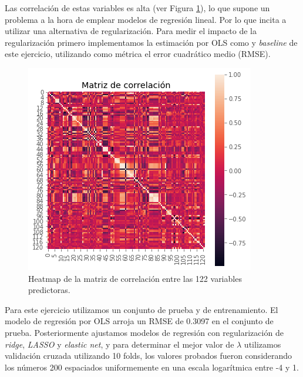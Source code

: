 \documentclass{article}
\begin{document}
Las correlación de estas variables es alta (ver Figura \ref{fig:matriz_cor_ejer1}), lo que supone un problema a la hora de emplear modelos de regresión lineal. Por lo que incita a utilizar una alternativa de regularización. Para medir el impacto de la regularización primero implementamos la estimación por OLS como y \textit{baseline} de este ejercicio, utilizando como métrica el error cuadrático medio (RMSE). 
\begin{figure}[H]
    \centering
    \includegraphics[scale=0.4]{figure/matriz_cor_ejer1.png}
    \caption{Heatmap de la matriz de correlación entre las 122 variables predictoras.}
    \label{fig:matriz_cor_ejer1}
\end{figure}
Para este ejercicio utilizamos un conjunto de prueba y de entrenamiento. El modelo de regresión por OLS arroja un RMSE de 0.3097 en el conjunto de prueba. Posteriormente ajustamos modelos de regresión con regularización de \textit{ridge}, \textit{LASSO} y \textit{elastic net}, y para determinar el mejor valor de $\lambda$ utilizamos validación cruzada utilizando 10 folds, los valores probados fueron considerando los números 200 espaciados uniformemente en una escala logarítmica entre -4 y 1. 
\end{document}
